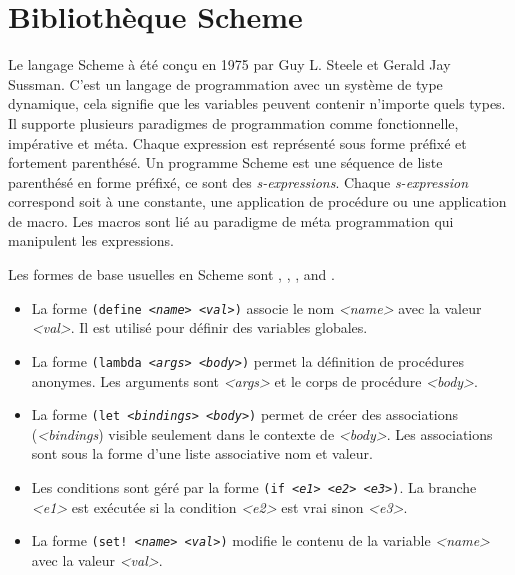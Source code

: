 
\chapter{Bibliothèque Scheme}

Le langage Scheme\cite{Clinger:2008:SCH:1529966.1529973} à été conçu en 1975 par Guy L. Steele et Gerald
Jay Sussman.  C'est un langage de programmation avec un système de type
dynamique, cela signifie que les variables peuvent contenir n'importe quels
types. Il supporte plusieurs paradigmes de programmation comme fonctionnelle,
impérative et méta. Chaque expression est représenté sous forme préfixé et
fortement parenthésé.  Un programme Scheme est une séquence de liste parenthésé
en forme préfixé, ce sont des \textit{s-expressions}.  Chaque
\textit{s-expression} correspond soit à une constante, une application de
procédure ou une application de macro. Les macros sont lié au paradigme de
méta programmation qui manipulent les expressions.

Les formes de base usuelles en Scheme sont , ,
,  and .
\begin{itemize}
  \item La forme \texttt{(define \textit{<name>} \textit{<val>})} associe le nom \textit{<name>} avec
    la valeur \textit{<val>}. Il est utilisé pour définir des variables globales.

  \item La forme \texttt{(lambda \textit{<args>} \textit{<body>})} permet la définition de
    procédures anonymes. Les arguments sont \textit{<args>} et le corps
    de procédure \textit{<body>}.

  \item La forme \texttt{(let \textit{<bindings>} \textit{<body>})} permet de créer des
    associations (\textit{<bindings}) visible seulement dans le contexte de
    \textit{<body>}. Les associations sont sous la forme d'une liste
    associative nom et valeur.

  \item Les conditions sont géré par la forme \texttt{(if \textit{<e1>} \textit{<e2>} \textit{<e3>})}.
    La branche \textit{<e1>} est exécutée si la condition \textit{<e2>} est
    vrai sinon \textit{<e3>}.

  \item La forme \texttt{(set! \textit{<name>} \textit{<val>})} modifie le contenu de la variable
    \textit{<name>} avec la valeur \textit{<val>}.
\end{itemize}

